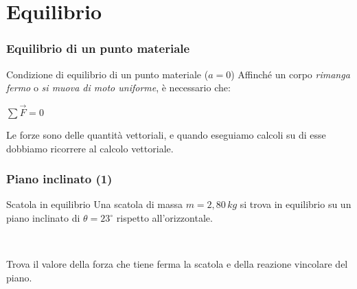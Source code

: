 \documentclass[]{beamer}
\theoremstyle{plain}
\begin{document}
\section{Equilibrio}



\begin{frame}
  \frametitle{Equilibrio di un punto materiale}
\begin{block}{Condizione di equilibrio di un punto materiale ($ a=0 $)}
Affinché un corpo \emph{rimanga fermo} o \emph{si muova di moto uniforme}, è necessario che:
\begin{center}
\colorbox{blue!30}{$ \sum \vec{F} = 0 $}
\end{center}\pause
\end{block}
Le forze sono delle \alert{quantità vettoriali}, e quando eseguiamo calcoli su di esse dobbiamo ricorrere al calcolo vettoriale.
\end{frame}



\begin{frame}
\frametitle{Piano inclinato (1)}
\begin{exampleblock}{Scatola in equilibrio}
Una scatola di massa $ m=2,80 \, kg $ si trova in equilibrio su un piano inclinato di $ \theta = 23^\circ $ rispetto all'orizzontale.

~

Trova il valore della forza che tiene ferma la scatola e della reazione vincolare del piano.
\end{exampleblock}
\end{frame}
\end{document}
